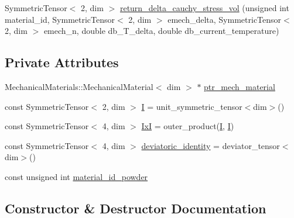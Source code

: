 \begin{DoxyCompactItemize}
\item 
Symmetric\+Tensor$<$ 2, dim $>$ \hyperlink{classConstitutive__Laws_1_1Thermo__Elasto__Plastic_a5339549a71ccf35f14b23c3286359fa3}{return\+\_\+delta\+\_\+cauchy\+\_\+stress\+\_\+vol} (unsigned int material\+\_\+id, Symmetric\+Tensor$<$ 2, dim $>$ emech\+\_\+delta, Symmetric\+Tensor$<$ 2, dim $>$ emech\+\_\+n, double db\+\_\+\+T\+\_\+delta, double db\+\_\+current\+\_\+temperature)
\end{DoxyCompactItemize}
\subsection*{Private Attributes}
\begin{DoxyCompactItemize}
\item 
Mechanical\+Materials\+::\+Mechanical\+Material$<$ dim $>$ $\ast$ \hyperlink{classConstitutive__Laws_1_1Thermo__Elasto__Plastic_a5a59fd71829d58859a122fe74628a9e4}{ptr\+\_\+mech\+\_\+material}
\item 
const Symmetric\+Tensor$<$ 2, dim $>$ \hyperlink{classConstitutive__Laws_1_1Thermo__Elasto__Plastic_a82407b5024a6bdd7dc424dfa3562acf6}{I} = unit\+\_\+symmetric\+\_\+tensor$<$dim$>$()
\item 
const Symmetric\+Tensor$<$ 4, dim $>$ \hyperlink{classConstitutive__Laws_1_1Thermo__Elasto__Plastic_a3e093ae5b5ef432f1f4fea14148dd8e1}{IxI} = outer\+\_\+product(\hyperlink{classConstitutive__Laws_1_1Thermo__Elasto__Plastic_a82407b5024a6bdd7dc424dfa3562acf6}{I}, \hyperlink{classConstitutive__Laws_1_1Thermo__Elasto__Plastic_a82407b5024a6bdd7dc424dfa3562acf6}{I})
\item 
const Symmetric\+Tensor$<$ 4, dim $>$ \hyperlink{classConstitutive__Laws_1_1Thermo__Elasto__Plastic_a5d88bd28aa5b3e74707ebb49de884755}{deviatoric\+\_\+identity} = deviator\+\_\+tensor$<$dim$>$()
\item 
const unsigned int \hyperlink{classConstitutive__Laws_1_1Thermo__Elasto__Plastic_a4f2bdb1404b0706803da3407ce991667}{material\+\_\+id\+\_\+powder}
\end{DoxyCompactItemize}


\subsection{Constructor \& Destructor Documentation}
